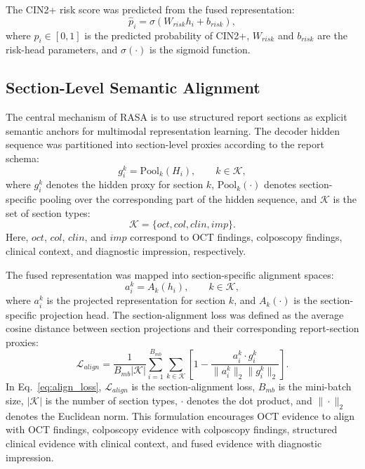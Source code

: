 The CIN2+ risk score was predicted from the fused representation:
\begin{equation}
\hat{p}_i=\sigma(W_{risk}h_i+b_{risk}),
\label{eq:risk_score}
\end{equation}
where \(\hat{p}_i\in[0,1]\) is the predicted probability of CIN2+, \(W_{risk}\) and \(b_{risk}\) are the risk-head parameters, and \(\sigma(\cdot)\) is the sigmoid function.

\subsection{Section-Level Semantic Alignment}
\label{subsec:methods_section_alignment}

The central mechanism of RASA is to use structured report sections as explicit semantic anchors for multimodal representation learning. The decoder hidden sequence was partitioned into section-level proxies according to the report schema:
\begin{equation}
g_i^k=\mathrm{Pool}_{k}(H_i),\qquad k\in\mathcal{K},
\label{eq:section_proxy}
\end{equation}
where \(g_i^k\) denotes the hidden proxy for section \(k\), \(\mathrm{Pool}_{k}(\cdot)\) denotes section-specific pooling over the corresponding part of the hidden sequence, and \(\mathcal{K}\) is the set of section types:
\begin{equation}
\mathcal{K}=\{oct,col,clin,imp\}.
\label{eq:section_set}
\end{equation}
Here, \(oct\), \(col\), \(clin\), and \(imp\) correspond to OCT findings, colposcopy findings, clinical context, and diagnostic impression, respectively.

The fused representation was mapped into section-specific alignment spaces:
\begin{equation}
a_i^{k}=A_k(h_i),\qquad k\in\mathcal{K},
\label{eq:section_projection}
\end{equation}
where \(a_i^k\) is the projected representation for section \(k\), and \(A_k(\cdot)\) is the section-specific projection head. The section-alignment loss was defined as the average cosine distance between section projections and their corresponding report-section proxies:
\begin{equation}
\mathcal{L}_{align}
=
\frac{1}{B_{mb}|\mathcal{K}|}
\sum_{i=1}^{B_{mb}}
\sum_{k\in\mathcal{K}}
\left[
1-
\frac{a_i^{k}\cdot g_i^{k}}{\|a_i^{k}\|_2\|g_i^{k}\|_2}
\right].
\label{eq:align_loss}
\end{equation}
In Eq.~\eqref{eq:align_loss}, \(\mathcal{L}_{align}\) is the section-alignment loss, \(B_{mb}\) is the mini-batch size, \(|\mathcal{K}|\) is the number of section types, \(\cdot\) denotes the dot product, and \(\|\cdot\|_2\) denotes the Euclidean norm. This formulation encourages OCT evidence to align with OCT findings, colposcopy evidence with colposcopy findings, structured clinical evidence with clinical context, and fused evidence with diagnostic impression.

